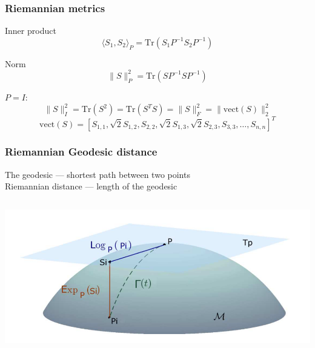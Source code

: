 \documentclass{beamer}
\begin{document}
\begin{frame}
\frametitle{Riemannian metrics}

\begin{block}{Inner product}
	\begin{equation*}
	\langle S_1, S_2 \rangle_P = \text{Tr}(S_1 P^{-1}S_2 P^{-1})
	\end{equation*}
\end{block}

\begin{block}{Norm}
	\begin{equation*}
	\|S \|_P^2 = \text{Tr}(S P^{-1}SP^{-1})
	\end{equation*}
\end{block}

$P = I:$
	\begin{equation*}
 \|S\|_I^2 = \text{Tr}(S^2) =  \text{Tr}(S^TS) = \|S\|_F^2 = \|\text{vect}(S)\|_2^2
 \end{equation*}
 \begin{equation*}
 \text{vect}(S) = \left[ S_{1,1}, \sqrt{2}S_{1,2}, S_{2,2}, \sqrt{2}S_{1,3} ,  \sqrt{2}S_{2,3}, S_{3,3}, \dots, S_{n,n}  \right]^T
 \end{equation*}
 
\end{frame}
\begin{frame}
\frametitle{Riemannian Geodesic distance}

\begin{block}{}
	The geodesic --- shortest path between two points\\
	Riemannian distance --- length of the geodesic
\end{block}
\begin{columns}[c] 
\includegraphics[scale=0.45]{manifold.png}
\end{columns}

\end{frame}
\end{document}
